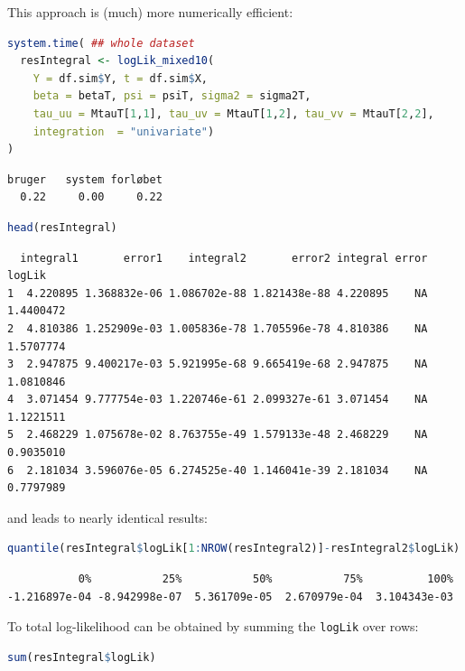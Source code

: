 \documentclass[12pt]{article}
\begin{document}
\clearpage

This approach is (much) more numerically efficient:
\begin{lstlisting}[language=r,numbers=none]
system.time( ## whole dataset 
  resIntegral <- logLik_mixed10(
    Y = df.sim$Y, t = df.sim$X,
    beta = betaT, psi = psiT, sigma2 = sigma2T,
    tau_uu = MtauT[1,1], tau_uv = MtauT[1,2], tau_vv = MtauT[2,2],
    integration  = "univariate")
)
\end{lstlisting}

\label{}
\begin{verbatim}
bruger   system forløbet 
  0.22     0.00     0.22
\end{verbatim}


\begin{lstlisting}[language=r,numbers=none]
head(resIntegral)
\end{lstlisting}

\label{}
\begin{verbatim}
  integral1       error1    integral2       error2 integral error    logLik
1  4.220895 1.368832e-06 1.086702e-88 1.821438e-88 4.220895    NA 1.4400472
2  4.810386 1.252909e-03 1.005836e-78 1.705596e-78 4.810386    NA 1.5707774
3  2.947875 9.400217e-03 5.921995e-68 9.665419e-68 2.947875    NA 1.0810846
4  3.071454 9.777754e-03 1.220746e-61 2.099327e-61 3.071454    NA 1.1221511
5  2.468229 1.075678e-02 8.763755e-49 1.579133e-48 2.468229    NA 0.9035010
6  2.181034 3.596076e-05 6.274525e-40 1.146041e-39 2.181034    NA 0.7797989
\end{verbatim}



and leads to nearly identical results:
\begin{lstlisting}[language=r,numbers=none]
quantile(resIntegral$logLik[1:NROW(resIntegral2)]-resIntegral2$logLik)
\end{lstlisting}

\label{}
\begin{verbatim}
           0%           25%           50%           75%          100% 
-1.216897e-04 -8.942998e-07  5.361709e-05  2.670979e-04  3.104343e-03
\end{verbatim}


To total log-likelihood can be obtained by summing the \texttt{logLik} over
rows:
\begin{lstlisting}[language=r,numbers=none]
sum(resIntegral$logLik)
\end{lstlisting}
\end{document}
